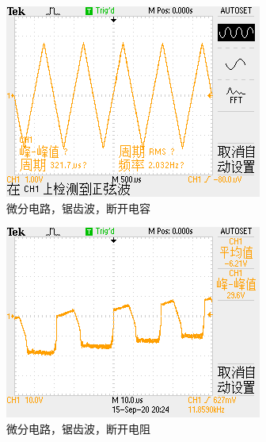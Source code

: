 \documentclass{ctexart}
\begin{document}
\begin{figure}[H]
  \centering
  \begin{subfigure}{.32\textwidth}
    \centering
    \includegraphics[width=\linewidth]{电路图像/微分电路/输入锯齿波/三角波有电阻无电容}
    \caption{微分电路，锯齿波，断开电容}
  \end{subfigure}
  \begin{subfigure}{.32\textwidth}
    \centering
    \includegraphics[width=\linewidth]{电路图像/微分电路/输入锯齿波/三角波无电阻有电容}
    \caption{微分电路，锯齿波，断开电阻}
  \end{subfigure}
  \begin{subfigure}{.32\textwidth}
    \centering

\end{subfigure}
\end{figure}
\end{document}
